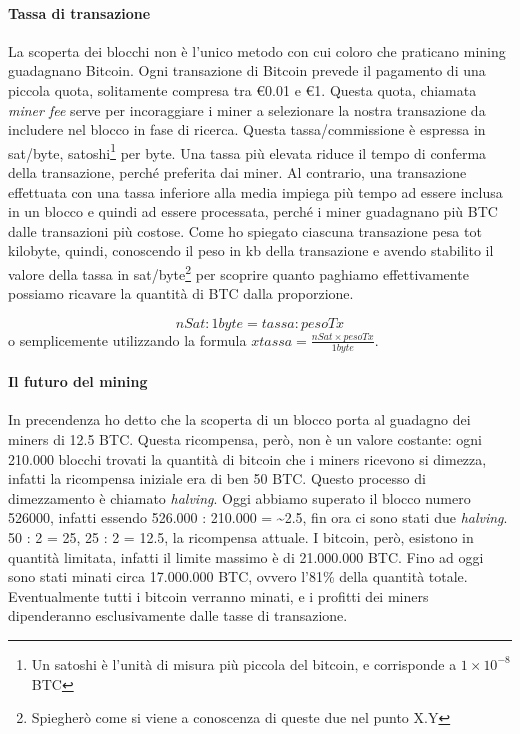 \documentclass {article}
\begin{document}
\paragraph {Tassa di transazione}

La scoperta dei blocchi non è l'unico metodo con cui coloro che praticano mining guadagnano Bitcoin.
Ogni transazione di Bitcoin prevede il pagamento di una piccola quota, solitamente compresa tra \euro{0.01} e \euro{1}.
Questa quota, chiamata \textit{miner fee} serve per incoraggiare i miner a selezionare la nostra transazione da includere nel blocco in fase di ricerca.
Questa tassa/commissione è espressa in sat/byte, satoshi\footnote{Un satoshi è l'unità di misura più piccola del bitcoin, e corrisponde a $1 \times 10^{-8}$ BTC} per byte.
Una tassa più elevata riduce il tempo di conferma della transazione, perché preferita dai miner. Al contrario, una transazione effettuata con una tassa inferiore alla media impiega più tempo ad essere inclusa in un blocco e quindi ad essere processata, perché i miner guadagnano più BTC dalle transazioni più costose.
Come ho spiegato ciascuna transazione pesa tot kilobyte, quindi, conoscendo il peso in kb della transazione e avendo stabilito il valore della tassa in sat/byte\footnote{Spiegherò come si viene a conoscenza di queste due nel punto X.Y} per scoprire quanto paghiamo effettivamente possiamo ricavare la quantità di BTC dalla proporzione.

$$ nSat : 1 byte = tassa : pesoTx $$
%
o semplicemente utilizzando la formula $x tassa = \frac{nSat \times pesoTx}{1 byte}$.

\paragraph {Il futuro del mining}

In precendenza ho detto che la scoperta di un blocco porta al guadagno dei miners di 12.5 BTC.
Questa ricompensa, però, non è un valore costante: ogni 210.000 blocchi trovati la quantità di bitcoin che i miners ricevono si dimezza, infatti la ricompensa iniziale era di ben 50 BTC. Questo processo di dimezzamento è chiamato \textit{halving}.
Oggi abbiamo superato il blocco numero 526000, infatti essendo 526.000 : 210.000 = \textasciitilde 2.5, fin ora ci sono stati due \textit{halving}.
50 : 2 = 25, 25 : 2 = 12.5, la ricompensa attuale.
I bitcoin, però, esistono in quantità limitata, infatti il limite massimo è di 21.000.000 BTC.
Fino ad oggi sono stati minati circa 17.000.000 BTC, ovvero l'81\% della quantità totale.
Eventualmente tutti i bitcoin verranno minati, e i profitti dei miners dipenderanno esclusivamente dalle tasse di transazione.
\end{document}
